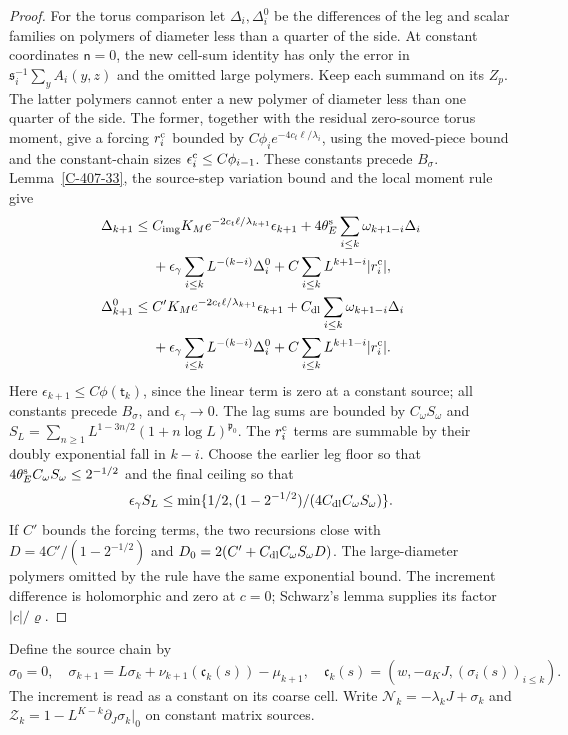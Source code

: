 \documentclass[11pt,letterpaper,reqno]{amsart}
\theoremstyle{definition}
\theoremstyle{remark}
\begin{document}
\begin{proof}
For the torus comparison let $\Delta_i,\Delta_i^0$ be the
differences of the leg and scalar families on polymers
of diameter less than a quarter of the side. At constant
coordinates $\mathsf n=0$, the new cell-sum identity has
only the error in $\mathfrak s_i^{-1}\sum_y A_i(y,z)$ and
the omitted large polymers. Keep each summand on its $Z_p$.
The latter polymers cannot enter a new polymer of diameter
less than one quarter of the side. The former, together
with the residual zero-source torus moment, give a forcing
$r_i^{\rm c}$ bounded by
$C\phi_i e^{-4c_t\ell/\lambda_i}$, using the moved-piece
bound and the constant-chain sizes $\epsilon_i^{\rm c}
\le C\phi_{i-1}$. These constants precede $B_\sigma$.
Lemma~\ref{C-407-33}, the source-step variation bound and
the local moment rule give
\[
\begin{split}
 \Delta_{k+1}\le{}&C_{\rm img}K_Me^{-2c_t\ell/\lambda_{k+1}}
 \epsilon_{k+1}+4\theta_E^{\rm s}\sum_{i\le k}\omega_{k+1-i}\Delta_i\\
 &+\epsilon_\gamma\sum_{i\le k}L^{-(k-i)}\Delta_i^0
                  +C\sum_{i\le k}L^{k+1-i}|r_i^{\rm c}|,\\
 \Delta_{k+1}^0\le{}&C'K_Me^{-2c_t\ell/\lambda_{k+1}}
 \epsilon_{k+1}+C_{\rm dl}\sum_{i\le k}\omega_{k+1-i}\Delta_i\\
 &+\epsilon_\gamma\sum_{i\le k}L^{-(k-i)}\Delta_i^0
                  +C\sum_{i\le k}L^{k+1-i}|r_i^{\rm c}|.
\end{split}
\]
Here $\epsilon_{k+1}\le C\phi(\mathsf t_k)$, since the
linear term is zero at a constant source; all constants
precede $B_\sigma$, and $\epsilon_\gamma\to0$.
The lag sums are bounded by $C_\omega S_\omega$ and
$S_L=\sum_{n\ge1}L^{1-3n/2}(1+n\log L)^{\mathfrak p_0}$.
The $r_i^{\rm c}$ terms are summable by their doubly exponential
fall in $k-i$. Choose the earlier leg floor so that
$4\theta_E^{\rm s}C_\omega S_\omega\le2^{-1/2}$ and the final
ceiling so that
\[
 \epsilon_\gamma S_L\le
 \min\{1/2,(1-2^{-1/2})/(4C_{\rm dl}C_\omega S_\omega)\}.
\]
If $C'$ bounds the forcing terms, the two recursions close
with $D=4C'/(1-2^{-1/2})$ and
$D_0=2(C'+C_{\rm dl}C_\omega S_\omega D)$.
The large-diameter polymers omitted by the rule have the
same exponential bound. The increment difference is
holomorphic and zero at $c=0$; Schwarz's lemma supplies
its factor $|c|/\varrho$.
\end{proof}

Define the source chain by
\[
 \sigma_0=0,\quad
 \sigma_{k+1}=L\sigma_k+\nu_{k+1}(\mathfrak c_k(s))-\mu_{k+1},
 \quad \mathfrak c_k(s)=(w,-a_KJ,(\sigma_i(s))_{i\le k}).
\]
The increment is read as a constant on its coarse cell.
Write $\mathcal N_k=-\lambda_kJ+\sigma_k$ and
$\mathcal Z_k=1-L^{K-k}\partial_J\sigma_k|_0$ on constant
matrix sources.
\end{document}
